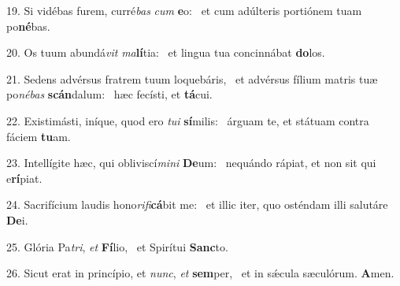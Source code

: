 19. Si vidébas furem, curré\textit{bas} \textit{cum} \textbf{e}o: \ast\  et cum adúlteris portiónem tuam po\textbf{né}bas.\

20. Os tuum abundá\textit{vit} \textit{ma}\textbf{lí}tia: \ast\  et lingua tua concinnábat \textbf{do}los.\

21. Sedens advérsus fratrem tuum loquebáris, \dag\  et advérsus fílium matris tuæ po\textit{né}\textit{bas} \textbf{scán}dalum: \ast\  hæc fecísti, et \textbf{tá}cui.\

22. Existimásti, iníque, quod ero \textit{tu}\textit{i} \textbf{sí}milis: \ast\  árguam te, et státuam contra fáciem \textbf{tu}am.\

23. Intellígite hæc, qui obliviscí\textit{mi}\textit{ni} \textbf{De}um: \ast\  nequándo rápiat, et non sit qui e\textbf{rí}piat.\

24. Sacrifícium laudis hono\textit{ri}\textit{fi}\textbf{cá}bit me: \ast\  et illic iter, quo osténdam illi salutáre \textbf{De}i.\

25. Glória Pa\textit{tri}, \textit{et} \textbf{Fí}lio, \ast\  et Spirítui \textbf{Sanc}to.\

26. Sicut erat in princípio, et \textit{nunc}, \textit{et} \textbf{sem}per, \ast\  et in sǽcula sæculórum. \textbf{A}men.\


